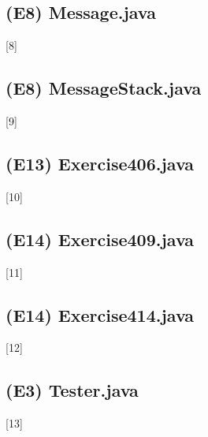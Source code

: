 \documentclass[main.tex]{subfiles}
\begin{document}
\newpage
\subsection*{(E8) Message.java}
\hypertarget{Message}{[8]}


\newpage
\subsection*{(E8) MessageStack.java}
\hypertarget{MessageStack}{[9]}


\newpage
\subsection*{(E13) Exercise406.java}
\hypertarget{Exercise406}{[10]}


\newpage
\subsection*{(E14) Exercise409.java}
\hypertarget{Exercise409}{[11]}


\newpage
\subsection*{(E14) Exercise414.java}
\hypertarget{Exercise414}{[12]}


\newpage
\subsection*{(E3) Tester.java}
\hypertarget{Tester}{[13]}

\end{document}
